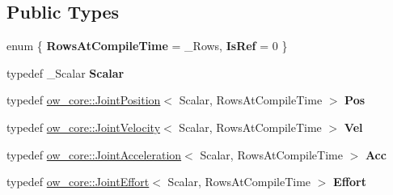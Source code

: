 \subsection*{Public Types}
\begin{DoxyCompactItemize}
\item 
enum \{ {\bfseries Rows\+At\+Compile\+Time} = \+\_\+\+Rows, 
{\bfseries Is\+Ref} = 0
 \}\hypertarget{structow_1_1traits_3_01ow__core_1_1JointState_3_01__Scalar_00_01__Rows_01_4_01_4_a99b39261dda210a68a8453b84e535fea}{}\label{structow_1_1traits_3_01ow__core_1_1JointState_3_01__Scalar_00_01__Rows_01_4_01_4_a99b39261dda210a68a8453b84e535fea}

\item 
typedef \+\_\+\+Scalar {\bfseries Scalar}\hypertarget{structow_1_1traits_3_01ow__core_1_1JointState_3_01__Scalar_00_01__Rows_01_4_01_4_a7d69316a500ef5c742f214aee98f019e}{}\label{structow_1_1traits_3_01ow__core_1_1JointState_3_01__Scalar_00_01__Rows_01_4_01_4_a7d69316a500ef5c742f214aee98f019e}

\item 
typedef \hyperlink{classow__core_1_1JointPosition}{ow\+\_\+core\+::\+Joint\+Position}$<$ Scalar, Rows\+At\+Compile\+Time $>$ {\bfseries Pos}\hypertarget{structow_1_1traits_3_01ow__core_1_1JointState_3_01__Scalar_00_01__Rows_01_4_01_4_a6bb9a76ab73831d55367e0b59feb1dcf}{}\label{structow_1_1traits_3_01ow__core_1_1JointState_3_01__Scalar_00_01__Rows_01_4_01_4_a6bb9a76ab73831d55367e0b59feb1dcf}

\item 
typedef \hyperlink{classow__core_1_1JointVelocity}{ow\+\_\+core\+::\+Joint\+Velocity}$<$ Scalar, Rows\+At\+Compile\+Time $>$ {\bfseries Vel}\hypertarget{structow_1_1traits_3_01ow__core_1_1JointState_3_01__Scalar_00_01__Rows_01_4_01_4_a09c5fc9b57fcddd46bcb3c53718c1461}{}\label{structow_1_1traits_3_01ow__core_1_1JointState_3_01__Scalar_00_01__Rows_01_4_01_4_a09c5fc9b57fcddd46bcb3c53718c1461}

\item 
typedef \hyperlink{classow__core_1_1JointAcceleration}{ow\+\_\+core\+::\+Joint\+Acceleration}$<$ Scalar, Rows\+At\+Compile\+Time $>$ {\bfseries Acc}\hypertarget{structow_1_1traits_3_01ow__core_1_1JointState_3_01__Scalar_00_01__Rows_01_4_01_4_a36773c97324698952908ee08a882f274}{}\label{structow_1_1traits_3_01ow__core_1_1JointState_3_01__Scalar_00_01__Rows_01_4_01_4_a36773c97324698952908ee08a882f274}

\item 
typedef \hyperlink{classow__core_1_1JointEffort}{ow\+\_\+core\+::\+Joint\+Effort}$<$ Scalar, Rows\+At\+Compile\+Time $>$ {\bfseries Effort}\hypertarget{structow_1_1traits_3_01ow__core_1_1JointState_3_01__Scalar_00_01__Rows_01_4_01_4_a3f034a31e4152b51ee8f29f74102af0b}{}\label{structow_1_1traits_3_01ow__core_1_1JointState_3_01__Scalar_00_01__Rows_01_4_01_4_a3f034a31e4152b51ee8f29f74102af0b}

\end{DoxyCompactItemize}


